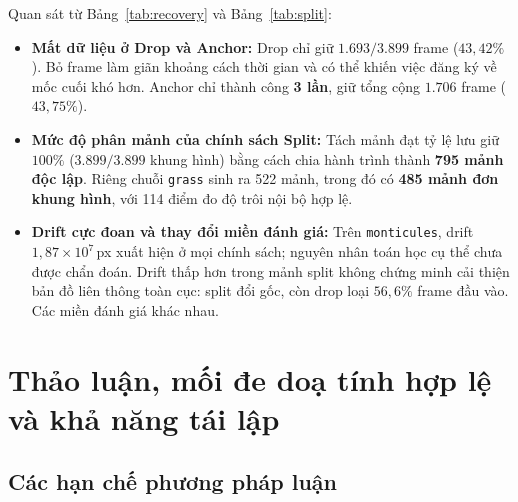 \documentclass[conference]{IEEEtran}
\begin{document}
Quan sát từ Bảng~\ref{tab:recovery} và Bảng~\ref{tab:split}:
\begin{itemize}
    \item \textbf{Mất dữ liệu ở Drop và Anchor:} Drop chỉ giữ $1.693/3.899$ frame ($43{,}42\%$). Bỏ frame làm giãn khoảng cách thời gian và có thể khiến việc đăng ký về mốc cuối khó hơn. Anchor chỉ thành công \textbf{3 lần}, giữ tổng cộng $1.706$ frame ($43{,}75\%$).
    \item \textbf{Mức độ phân mảnh của chính sách Split:} Tách mảnh đạt tỷ lệ lưu giữ $100\%$ ($3.899/3.899$ khung hình) bằng cách chia hành trình thành \textbf{795 mảnh độc lập}. Riêng chuỗi \texttt{grass} sinh ra 522 mảnh, trong đó có \textbf{485 mảnh đơn khung hình}, với 114 điểm đo độ trôi nội bộ hợp lệ.
    \item \textbf{Drift cực đoan và thay đổi miền đánh giá:} Trên \texttt{monticules}, drift $1{,}87\times10^7$\,px xuất hiện ở mọi chính sách; nguyên nhân toán học cụ thể chưa được chẩn đoán. Drift thấp hơn trong mảnh split không chứng minh cải thiện bản đồ liên thông toàn cục: split đổi gốc, còn drop loại $56{,}6\%$ frame đầu vào. Các miền đánh giá khác nhau.
\end{itemize}

\section{Thảo luận, mối đe doạ tính hợp lệ và khả năng tái lập}
\label{sec:discussion}

\subsection{Các hạn chế phương pháp luận}
\label{subsec:validity}
\end{document}
